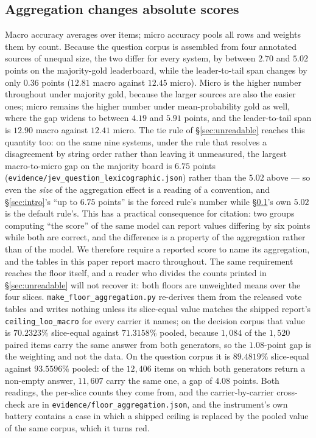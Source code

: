 \documentclass{article}
\newcommand{\ids}[1]{\texttt{\small #1}} %
\begin{document}
\subsection{Aggregation changes absolute scores}
\label{sec:agg} Macro accuracy averages over items; micro accuracy pools all rows and weights them by count. Because the question corpus is assembled from four annotated sources of unequal size, the two differ for every system, by between $2.70$ and $5.02$ points on the majority-gold leaderboard, while the leader-to-tail span changes by only $0.36$ points ($12.81$ macro against $12.45$ micro). Micro is the higher number throughout under majority gold, because the larger sources are also the easier ones; micro remains the higher number under mean-probability gold as well, where the gap widens to between $4.19$ and $5.91$ points, and the leader-to-tail span is $12.90$ macro against $12.41$ micro. The tie rule of \S\ref{sec:unreadable} reaches this quantity too: on the same nine systems, under the rule that resolves a disagreement by string order rather than leaving it unmeasured, the largest macro-to-micro gap on the majority board is $6.75$ points (\ids{evidence/jev\_question\_lexicographic.json}) rather than the $5.02$ above --- so even the \emph{size} of the aggregation effect is a reading of a convention, and \S\ref{sec:intro}'s ``up to $6.75$ points'' is the forced rule's number while \S\ref{sec:agg}'s own $5.02$ is the default rule's. This has a practical consequence for citation: two groups computing ``the score'' of the same model can report values differing by six points while both are correct, and the difference is a property of the aggregation rather than of the model. We therefore require a reported score to name its aggregation, and the tables in this paper report macro throughout. The same requirement reaches the floor itself, and a reader who divides the counts printed in \S\ref{sec:unreadable} will not recover it: both floors are unweighted means over the four slices. \ids{make\_floor\_aggregation.py} re-derives them from the released vote tables and writes nothing unless its slice-equal value matches the shipped report's \texttt{ceiling\_loo\_macro} for every carrier it names; on the decision corpus that value is $70.2323\%$ slice-equal against $71.3158\%$ pooled, because $1{,}084$ of the $1{,}520$ paired items carry the same answer from both generators, so the $1.08$-point gap is the weighting and not the data. On the question corpus it is $89.4819\%$ slice-equal against $93.5596\%$ pooled: of the $12{,}406$ items on which both generators return a non-empty answer, $11{,}607$ carry the same one, a gap of $4.08$ points. Both readings, the per-slice counts they come from, and the carrier-by-carrier cross-check are in \ids{evidence/floor\_aggregation.json}, and the instrument's own battery contains a case in which a shipped ceiling is replaced by the pooled value of the same corpus, which it turns red.
\end{document}

